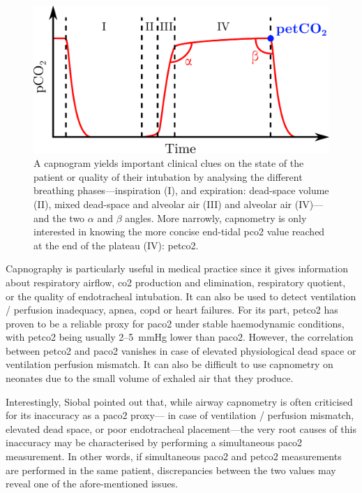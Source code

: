 \begin{figure}
	\centering
	\includegraphics[width=.80\linewidth]{1_main_matter/intro_figures/capnography_principle}
	\caption[Capnography \textit{vs} capnometry.]{A capnogram yields important clinical clues on the state of the patient or quality of their intubation by analysing the different breathing phases---inspiration (I), and expiration: dead-space volume (II), mixed dead-space and alveolar air (III) and alveolar air (IV)---and the two $\alpha$ and $\beta$ angles\cite{capnography_gravenstein, capnography_site}. More narrowly, capnometry is only interested in knowing the more concise end-tidal \gls{pco2} value reached at the end of the plateau (IV): \gls{petco2}.}
	\label{fig:capnometry_principle}
\end{figure}

Capnography is particularly useful in medical practice since it gives information about respiratory airflow, \gls{co2} production and elimination, respiratory quotient, or the quality of endotracheal intubation. It can also be used to detect ventilation / perfusion inadequacy, apnea, \gls{copd} or heart failures\cite{siobal2016, long2017}. For its part, \gls{petco2} has proven to be a reliable proxy for \gls{paco2} under stable haemodynamic conditions, with \gls{petco2} being usually 2--5~mmHg lower than \gls{paco2}\cite{siobal2016}. However, the correlation between \gls{petco2} and \gls{paco2} vanishes in case of elevated physiological dead space or ventilation perfusion mismatch\cite{wagner2015, amaddeo2016}. It can also be difficult to use capnometry on neonates due to the small volume of exhaled air that they produce\cite{hochwald2019}.

Interestingly, Siobal \etal{}\cite{siobal2016} pointed out that, while airway capnometry is often criticised for its inaccuracy as a \gls{paco2} proxy---\eg{} in case of ventilation / perfusion mismatch, elevated dead space, or poor endotracheal placement---the very root causes of this inaccuracy may be characterised by performing a simultaneous \gls{paco2} measurement. In other words, if simultaneous \gls{paco2} and \gls{petco2} measurements are performed in the same patient, discrepancies between the two values may reveal one of the afore-mentioned issues.

